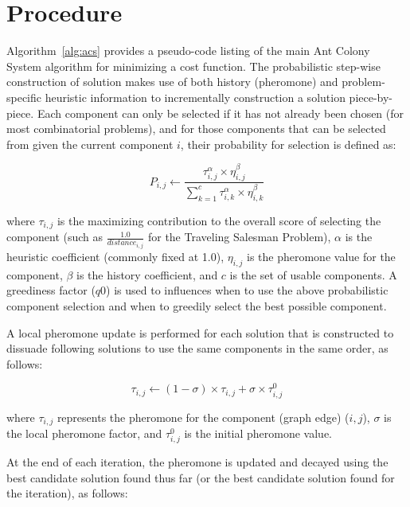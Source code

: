 \documentclass[a4paper, 11pt]{article}
\begin{document}
\section{Procedure}
\label{sec:procedure}
Algorithm~\ref{alg:acs} provides a pseudo-code listing of the main Ant Colony System algorithm for minimizing a cost function. 
The probabilistic step-wise construction of solution makes use of both history (pheromone) and problem-specific heuristic information to incrementally construction a solution piece-by-piece. Each component can only be selected if it has not already been chosen (for most combinatorial problems), and for those components that can  be selected from given the current component $i$, their probability for selection is defined as:

\begin{equation}
P_{i,j} \leftarrow \frac{\tau_{i,j}^{\alpha} \times \eta_{i,j}^{\beta}}{\sum_{k=1}^c \tau_{i,k}^{\alpha} \times \eta_{i,k}^{\beta}}
\end{equation}

where $\tau_{i,j}$ is the maximizing contribution to the overall score of selecting the component (such as $\frac{1.0}{distance_{i,j}}$ for the Traveling Salesman Problem), $\alpha$ is the heuristic coefficient (commonly fixed at 1.0), $\eta_{i,j}$ is the pheromone value for the component, $\beta$ is the history coefficient, and $c$ is the set of usable components. A greediness factor ($q0$) is used to influences when to use the above probabilistic component selection and when to greedily select the best possible component. 

A local pheromone update is performed for each solution that is constructed to dissuade following solutions to use the same components in the same order, as follows:

\begin{equation}
\tau_{i,j} \leftarrow (1-\sigma) \times \tau_{i,j} + \sigma \times \tau_{i,j}^{0}
\end{equation}

where $\tau_{i,j}$ represents the pheromone for the component (graph edge) ($i,j$), $\sigma$ is the local pheromone factor, and $\tau_{i,j}^{0}$ is the initial pheromone value.

At the end of each iteration, the pheromone is updated and decayed using the best candidate solution found thus far (or the best candidate solution found for the iteration), as follows:
\end{document}
